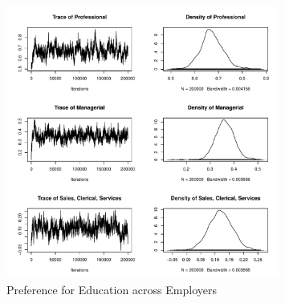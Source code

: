 \documentclass[12pt]{article}
\begin{document}
\begin{figure}[!ht]
\centering
\includegraphics[width=0.8\textwidth,page=2]{"../figure/labor_occ5_beta_educ_2018-03-04 17:06:20"}
\caption{Preference for Education across Employers}
\end{figure}

\clearpage


\end{document}
